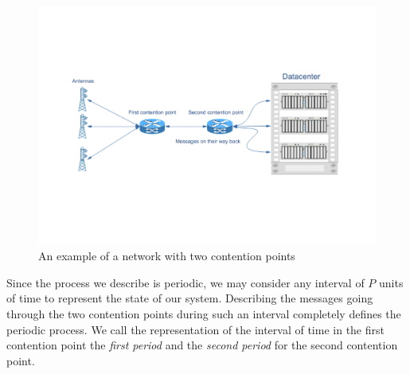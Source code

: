\documentclass[10pt, conference, letterpaper]{IEEEtran}
\begin{document}
\begin{center}
\begin{figure}
\centering
\includegraphics[scale=0.35]{network.pdf}
\centering
{}
\caption{An example of a network with two contention points}
\label{fig:model}
\end{figure}
\end{center}

Since the process we describe is periodic, we may consider any interval of $P$ units of time
to represent the state of our system. Describing the messages going through the two contention points during such an interval
completely defines the periodic process. We call the representation of the interval
of time in the first contention point the \emph{first period} and the \emph{second period}
for the second contention point.
\end{document}
